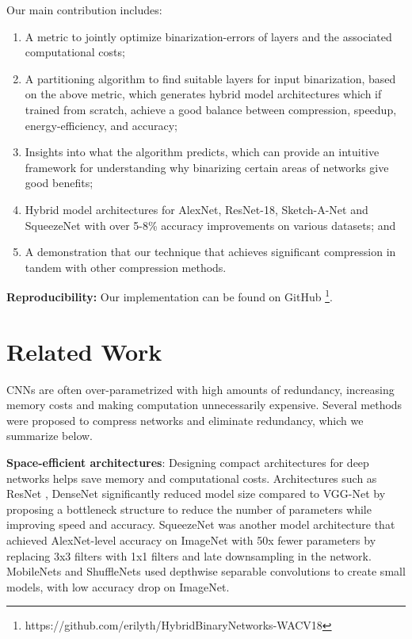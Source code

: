 \documentclass[10pt,twocolumn,letterpaper]{article}
\begin{document}
Our main contribution includes:\vspace{-0.2cm}
\begin{enumerate}
\item A metric to jointly optimize binarization-errors of layers and the associated computational costs;\vspace{-0.2cm}
\item A partitioning algorithm to find suitable layers for input binarization, based on the above metric, which generates hybrid model architectures which if trained from scratch, achieve a good balance between compression, speedup, energy-efficiency, and accuracy;\vspace{-0.2cm}
\item Insights into what the algorithm predicts, which can provide an intuitive framework for understanding why binarizing certain areas of networks give good benefits;\vspace{-0.2cm}
\item Hybrid model architectures for AlexNet, ResNet-18, Sketch-A-Net and SqueezeNet with over 5-8\% accuracy improvements on various datasets; and\vspace{-0.2cm}
\item A demonstration that our technique that achieves significant compression in tandem with other compression methods.
\end{enumerate}\vspace{-0.2cm}

{\bf Reproducibility:} Our implementation can be found on GitHub \footnote{https://github.com/erilyth/HybridBinaryNetworks-WACV18}.

\section{Related Work}

CNNs are often over-parametrized with high amounts of redundancy, increasing memory costs and making computation unnecessarily expensive. Several methods were proposed to compress networks and eliminate redundancy, which we summarize below.

{\bf Space-efficient architectures}: Designing compact architectures for deep networks helps save memory and computational costs. Architectures such as ResNet \cite{he2016deep}, DenseNet \cite{huang2017densely} significantly reduced model size compared to VGG-Net by proposing a bottleneck structure to reduce the number of parameters while improving speed and accuracy. SqueezeNet \cite{iandola2016squeezenet} was another model architecture that achieved AlexNet-level accuracy on ImageNet with 50x fewer parameters by replacing 3x3 filters with 1x1 filters and late downsampling in the network. MobileNets \cite{howard2017mobilenets} and ShuffleNets \cite{zhang2017shufflenet} used depthwise separable convolutions to create small models, with low accuracy drop on ImageNet.
\end{document}
